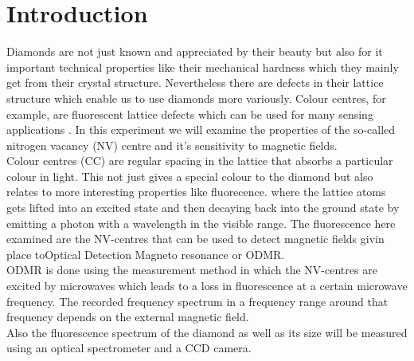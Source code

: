 \section{Introduction}

Diamonds are not just known and appreciated by their beauty but also for it important technical properties like their mechanical hardness which they mainly get from their crystal structure. Nevertheless there are defects in their lattice structure which enable us to use diamonds more variously. Colour centres, for example, are fluorescent lattice defects which can be used for many sensing applications \cite{anleitung}. In this experiment we will examine the properties of the so-called nitrogen vacancy (NV) centre and it's sensitivity to magnetic fields.\\

Colour centres (CC) are  regular spacing in the lattice that absorbs a particular colour in light. This not just gives a special colour to the diamond but also relates to more interesting properties like fluorecence. where the lattice atoms gets lifted into an excited state and then decaying back into the ground state by emitting a photon with a wavelength in the visible range. The fluorescence here examined are the NV-centres that can be used to detect magnetic fields givin place toOptical Detection Magneto resonance or ODMR.\\

ODMR is done using the measurement method in which the NV-centres are excited by microwaves which leads to a loss in fluorescence at a certain microwave frequency. The recorded frequency spectrum in a frequency range around that frequency depends on the external magnetic field.\\

Also the fluorescence spectrum of the diamond as well as its size will be measured using an optical spectrometer and a CCD camera.